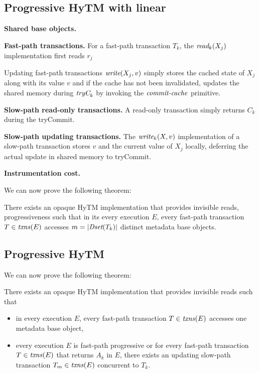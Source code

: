 \subsection{Progressive HyTM with linear}
%

%
%
\vspace{1mm}\noindent\textbf{Shared base objects.}


\vspace{1mm}\noindent\textbf{Fast-path transactions.}
For a fast-path transaction $T_k$, the $\textit{read}_k(X_j)$ implementation first reads $r_j$ 

Updating fast-path transactions 
$\textit{write} (X_j,v)$ simply stores the cached state of $X_j$ along with its value $v$ and
if the cache has not been invalidated, updates the shared memory
during $\textit{tryC}_k$ by invoking the $\ms{commit-cache}$ primitive.

\vspace{1mm}\noindent\textbf{Slow-path read-only transactions.}
A read-only transaction simply returns $C_k$ during the tryCommit.

\vspace{1mm}\noindent\textbf{Slow-path updating transactions.}
The $\textit{write}_k(X,v)$ implementation of a slow-path transaction stores
$v$ and the current value of $X_j$ locally, 
deferring the actual update in shared memory to tryCommit. 


\vspace{1mm}\noindent\textbf{Instrumentation cost.}
%

We can now prove the following theorem:
%
\begin{theorem}
\label{th:inswrite}
There exists an opaque HyTM implementation that provides invisible reads, progressiveness
such that
in its every execution $E$, every fast-path transaction $T\in \ms{txns}(E)$
accesses $m=|\textit{Dset}(T_k)|$ distinct metadata base objects.
\end{theorem}
%
\begin{proofsketch}

\end{proofsketch}
%
%

\subsection{Progressive HyTM}
%
We can now prove the following theorem:
%
\begin{theorem}
\label{th:inswrite2}
There exists an opaque HyTM implementation that provides invisible reads
such that 
\begin{itemize}
\item 
in every execution $E$,
every fast-path transaction $T\in \ms{txns}(E)$
accesses one metadata base object,
\item
every execution $E$ is fast-path progressive or for
every fast-path transaction $T\in \ms{txns}(E)$
that returns $A_k$ in $E$, there exists an updating slow-path transaction $T_m \in \ms{txns}(E)$
concurrent to $T_k$.
\end{itemize}
\end{theorem}
%
\begin{proofsketch}
% 
\end{proofsketch}
%